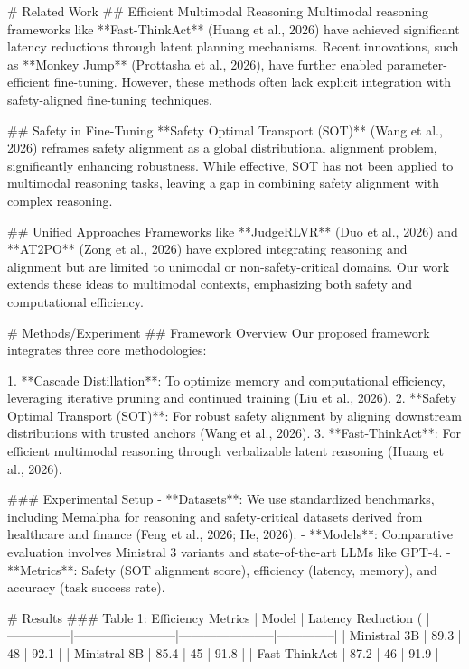 # Related Work  
## Efficient Multimodal Reasoning  
Multimodal reasoning frameworks like **Fast-ThinkAct** (Huang et al., 2026) have achieved significant latency reductions through latent planning mechanisms. Recent innovations, such as **Monkey Jump** (Prottasha et al., 2026), have further enabled parameter-efficient fine-tuning. However, these methods often lack explicit integration with safety-aligned fine-tuning techniques.

## Safety in Fine-Tuning  
**Safety Optimal Transport (SOT)** (Wang et al., 2026) reframes safety alignment as a global distributional alignment problem, significantly enhancing robustness. While effective, SOT has not been applied to multimodal reasoning tasks, leaving a gap in combining safety alignment with complex reasoning.

## Unified Approaches  
Frameworks like **JudgeRLVR** (Duo et al., 2026) and **AT2PO** (Zong et al., 2026) have explored integrating reasoning and alignment but are limited to unimodal or non-safety-critical domains. Our work extends these ideas to multimodal contexts, emphasizing both safety and computational efficiency.

# Methods/Experiment  
## Framework Overview  
Our proposed framework integrates three core methodologies:

1. **Cascade Distillation**: To optimize memory and computational efficiency, leveraging iterative pruning and continued training (Liu et al., 2026).
2. **Safety Optimal Transport (SOT)**: For robust safety alignment by aligning downstream distributions with trusted anchors (Wang et al., 2026).
3. **Fast-ThinkAct**: For efficient multimodal reasoning through verbalizable latent reasoning (Huang et al., 2026).

### Experimental Setup  
- **Datasets**: We use standardized benchmarks, including Memalpha for reasoning and safety-critical datasets derived from healthcare and finance (Feng et al., 2026; He, 2026).
- **Models**: Comparative evaluation involves Ministral 3 variants and state-of-the-art LLMs like GPT-4.
- **Metrics**: Safety (SOT alignment score), efficiency (latency, memory), and accuracy (task success rate).

# Results  
### Table 1: Efficiency Metrics  
| Model         | Latency Reduction (%
|---------------|------------------------|-----------------------|--------------|
| Ministral 3B  | 89.3                  | 48                    | 92.1         |
| Ministral 8B  | 85.4                  | 45                    | 91.8         |
| Fast-ThinkAct | 87.2                  | 46                    | 91.9         |

